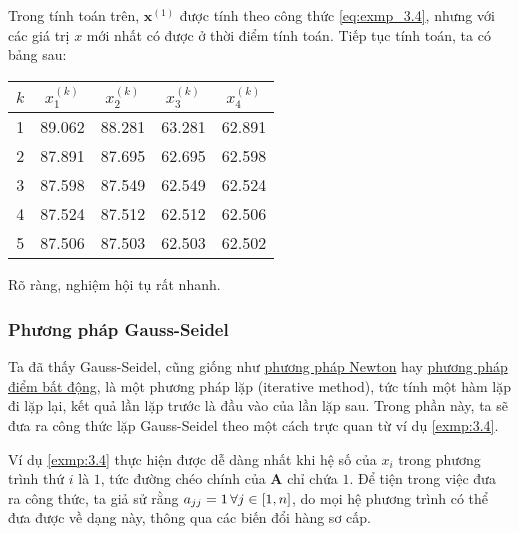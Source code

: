 \documentclass[../../Lectures]{subfiles}
\begin{document}
\begin{exmp}
    Trong tính toán trên, \(\bm{x}^{(1)}\) được tính theo công thức
    \eqref{eq:exmp_3.4}, nhưng với các giá trị \(x\) mới nhất có được ở thời
    điểm tính toán. Tiếp tục tính toán, ta có bảng sau:
    \begin{table}[H]
        \centering
        \begin{tabular}{ r *{4}{ S[table-format=2.3] } }
            \toprule
            \(k\)  &  \(x_1^{(k)}\)  &  \(x_2^{(k)}\)  &  \(x_3^{(k)}\)  &  \(x_4^{(k)}\)  \\
              &         89.062  &         88.281  &         63.281  &         62.891  \\
                2  &         87.891  &         87.695  &         62.695  &         62.598  \\
                3  &         87.598  &         87.549  &         62.549  &         62.524  \\
                4  &         87.524  &         87.512  &         62.512  &         62.506  \\
                5  &         87.506  &         87.503  &         62.503  &         62.502  \\
            \bottomrule
        \end{tabular}
    \end{table}

    Rõ ràng, nghiệm hội tụ rất nhanh.
\end{exmp}

\subsubsection{Phương pháp Gauss-Seidel}

Ta đã thấy Gauss-Seidel, cũng giống như \hyperref[chapter2:method:newton]{phương
pháp Newton} hay \hyperref[chapter2:method:fixed_point]{phương pháp điểm bất
động}, là một phương pháp lặp (iterative method), tức tính một hàm lặp đi lặp
lại, kết quả lần lặp trước là đầu vào của lần lặp sau. Trong phần này, ta sẽ đưa
ra công thức lặp Gauss-Seidel theo một cách trực quan từ ví dụ \ref{exmp:3.4}.

Ví dụ \ref{exmp:3.4} thực hiện được dễ dàng nhất khi hệ số của \(x_i\) trong
phương trình thứ \(i\) là \(1\), tức đường chéo chính của \(\bm{A}\) chỉ chứa
\(1\). Để tiện trong việc đưa ra công thức, ta giả sử rằng \(a_{jj} = 1 \,
\forall j \in \interval{1}{n}\), do mọi hệ phương trình có thể đưa được về dạng
này, thông qua các biến đổi hàng sơ cấp.
\end{document}
